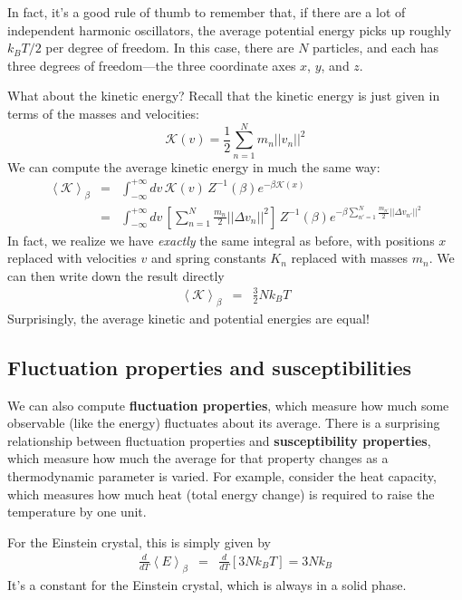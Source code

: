 \documentclass[english,course]{lecture}
\begin{document}
In fact, it's a good rule of thumb to remember that, if there are a lot of independent harmonic oscillators, the average potential energy picks up roughly $k_B T / 2$ per degree of freedom. 
In this case, there are $N$ particles, and each has three degrees of freedom---the three coordinate axes $x$, $y$, and $z$.

What about the kinetic energy?
Recall that the kinetic energy is just given in terms of the masses and velocities:
\begin{equation}
\mathcal{K}(v) = \frac{1}{2} \sum_{n=1}^N m_n ||v_n||^2
\end{equation}
We can compute the average kinetic energy in much the same way:
\begin{eqnarray}
\left< \mathcal{K} \right>_\beta &=& \int_{-\infty}^{+\infty} dv \, \mathcal{K}(v) \, Z^{-1}(\beta) e^{-\beta \mathcal{K}(x)} \\
&=& \int_{-\infty}^{+\infty} dv \, \left[ \sum_{n=1}^N \frac{m_n}{2} ||\Delta v_n||^2 \right] \, Z^{-1}(\beta) e^{-\beta \sum_{n'=1}^N \frac{m_{n'}}{2} ||\Delta v_{n'}||^2}
\end{eqnarray}
In fact, we realize we have \emph{exactly} the same integral as before, with positions $x$ replaced with velocities $v$ and spring constants $K_n$ replaced with masses $m_n$.
We can then write down the result directly
\begin{eqnarray}
\left< \mathcal{K} \right>_\beta &=& \frac{3}{2} N k_B T
\end{eqnarray}
Surprisingly, the average kinetic and potential energies are equal!

\subsection{Fluctuation properties and susceptibilities}

We can also compute {\bf fluctuation properties}, which measure how much some observable (like the energy) fluctuates about its average.
There is a surprising relationship between fluctuation properties and {\bf susceptibility properties}, which measure how much the average for that property changes as a thermodynamic parameter is varied.
For example, consider the heat capacity, which measures how much heat (total energy change) is required to raise the temperature by one unit.

For the Einstein crystal, this is simply given by
\begin{eqnarray}
\frac{d}{dT} \left<E\right>_\beta &=& \frac{d}{dT} [ 3 N k_B T ] = 3 N k_B
\end{eqnarray}
It's a constant for the Einstein crystal, which is always in a solid phase.
\end{document}
